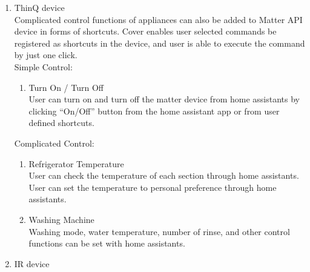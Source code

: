 \documentclass[conference]{IEEEtran}
\begin{document}
\begin{enumerate}[label=\arabic*.]
\item {\large{ThinQ device}}\\
Complicated control functions of appliances can also be added to Matter API device in forms of shortcuts. Cover enables user selected commands be registered as shortcuts in the device, and user is able to execute the command by just one click.\\
Simple Control:\\
\begin{enumerate}[label=\alph*.]
\item Turn On / Turn Off\\
User can turn on and turn off the matter device from home assistants by clicking “On/Off” button from the home assistant app or from user defined shortcuts.\\
\end{enumerate}
Complicated Control:\\
\begin{enumerate}[label=\alph*.]
\item Refrigerator Temperature\\
User can check the temperature of each section through home assistants.\\
User can set the temperature to personal preference through home assistants.\\
\item Washing Machine\\
Washing mode, water temperature, number of rinse, and other control functions can be set with home assistants.\\
\end{enumerate}

\item {\large{IR device}}\\
\begin{enumerate}[label=\alph*.]


\end{enumerate}
\end{enumerate}
\end{document}

